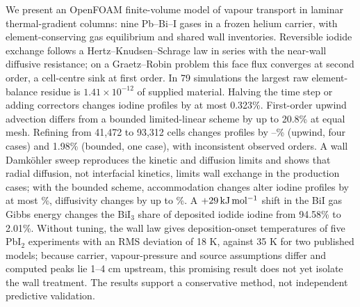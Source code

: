 We present an OpenFOAM finite-volume model of vapour transport in
laminar thermal-gradient columns: nine Pb--Bi--I gases in a frozen
helium carrier, with element-conserving gas equilibrium and shared wall
inventories.
Reversible iodide exchange follows a Hertz--Knudsen--Schrage law in
series with the near-wall diffusive resistance; on a Graetz--Robin
problem this face flux converges at second order, a cell-centre sink at
first order. In 79 simulations the largest raw element-balance
residue is $1.41\times10^{-12}$ of supplied material.
Halving the time step or adding correctors changes iodine profiles by
at most 0.323\%. First-order upwind advection differs from
a bounded limited-linear scheme by up to 20.8\% at equal mesh.
Refining from 41,472 to 93,312 cells changes profiles by
\SteelUpThree--\UpFourOthersMax\% (upwind, four cases) and 1.98\%
(bounded, one case), with inconsistent observed orders. A wall
Damk\"ohler sweep reproduces the kinetic and diffusion
limits and shows that radial diffusion, not interfacial
kinetics, limits wall exchange in the production cases; with the
bounded scheme, accommodation changes alter iodine profiles by at most
\PSAlphaTwoMax\%, diffusivity changes by up to \PSDMax\%.
A $+29\,\mathrm{kJ\,mol^{-1}}$ shift in the BiI gas Gibbs energy changes
the BiI$_3$ share of deposited iodide iodine from 94.58\% to 2.01\%. Without tuning, the wall
law gives deposition-onset temperatures of five PbI$_2$ experiments
with an RMS deviation of 18 K, against 35 K for two published models;
because carrier, vapour-pressure and source assumptions differ and
computed peaks lie 1--4 cm upstream, this promising result does not yet
isolate the wall treatment. The results support a conservative method,
not independent predictive validation.
